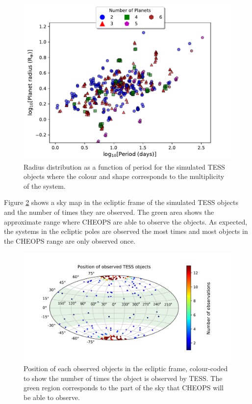 \documentclass[12pt]{report}
\begin{document}
\begin{figure}[h!]
 	 \centering
 	 \includegraphics[width=\textwidth]{img/R_P-plot_numP1.pdf}
 	  	 \caption{Radius distribution as a function of period for the simulated TESS objects where the colour and shape corresponds to the multiplicity of the system.}
 	  	 \label{fig:RP_plot_temp_multi}
\end{figure}
	\newpage Figure \ref{fig:skymap_TESS} shows a sky map in the ecliptic frame of the simulated TESS objects and the number of times they are observed. The green area shows the approximate range where CHEOPS are able to observe the objects.  As expected, the systems in the ecliptic poles are observed the most times and most objects in the CHEOPS range are only observed once.

\begin{figure}[h!]
	\centering
	\includegraphics[width=\textwidth]{img/skymap_TESS_numObs_new.pdf}
	  \caption{Position of each observed objects in the ecliptic frame, colour-coded to show the number of times the object is observed by TESS. The green region corresponds to the part of the sky that CHEOPS will be able to observe.}	
	  \label{fig:skymap_TESS}	
\end{figure}\newpage
\end{document}
